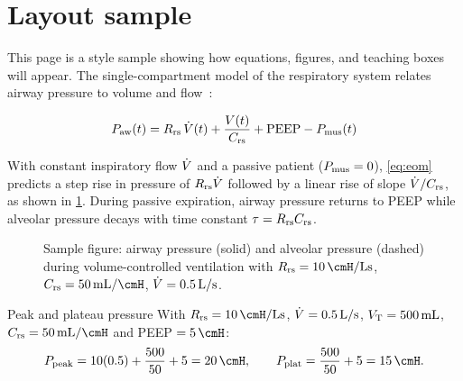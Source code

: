 \section{Layout sample}
This page is a style sample showing how equations, figures, and teaching boxes will appear. The single-compartment model of the respiratory system relates airway pressure to volume and flow~\citep{bates2009}:

\begin{keyequation}
\begin{equation}
  P_{\mathrm{aw}}(t) = R_{\mathrm{rs}}\,\dot{V}(t) + \frac{V(t)}{C_{\mathrm{rs}}} + \mathrm{PEEP} - P_{\mathrm{mus}}(t)
  \label{eq:eom}
\end{equation}
\end{keyequation}

With constant inspiratory flow $\dot{V}$ and a passive patient ($P_{\mathrm{mus}}=0$), \cref{eq:eom} predicts a step rise in pressure of $R_{\mathrm{rs}}\dot{V}$ followed by a linear rise of slope $\dot{V}/C_{\mathrm{rs}}$, as shown in \cref{fig:vc-sample}. During passive expiration, airway pressure returns to PEEP while alveolar pressure decays with time constant $\tau=R_{\mathrm{rs}}C_{\mathrm{rs}}$.

\begin{figure}[ht]
\centering
{}
\caption{Sample figure: airway pressure (solid) and alveolar pressure (dashed) during volume-controlled ventilation with $\Rrs=\SI{10}{\cmH\per\liter\second}$, $\Crs=\SI{50}{\milli\liter\per\cmH}$, $\dot{V}=\SI{0.5}{\liter\per\second}$.}
\label{fig:vc-sample}
\end{figure}

\begin{example}{Peak and plateau pressure}
With $\Rrs=\SI{10}{\cmH\per\liter\second}$, $\dot{V}=\SI{0.5}{\liter\per\second}$, $V_{\mathrm{T}}=\SI{500}{\milli\liter}$, $\Crs=\SI{50}{\milli\liter\per\cmH}$ and PEEP $=\SI{5}{\cmH}$:
\[
  P_{\text{peak}} = 10(0.5) + \frac{500}{50} + 5 = \SI{20}{\cmH},\qquad
  P_{\text{plat}} = \frac{500}{50} + 5 = \SI{15}{\cmH}.
\]
\end{example}

